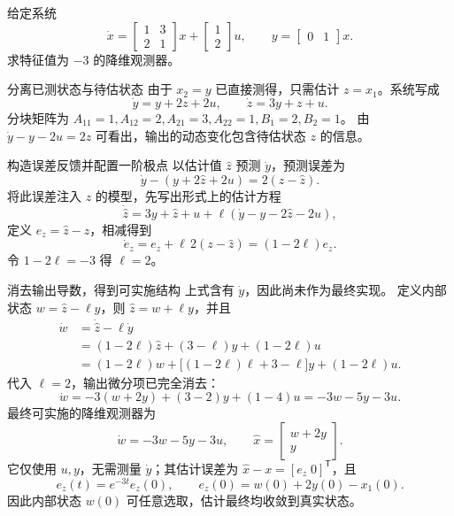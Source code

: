 \documentclass[11pt]{article}
\begin{document}
\begin{problem}[原题 2]
给定系统
\[
 \dot x=\begin{bmatrix}1&3\\2&1\end{bmatrix}x+
 \begin{bmatrix}1\\2\end{bmatrix}u,
 \qquad y=\begin{bmatrix}0&1\end{bmatrix}x.
\]
求特征值为 $-3$ 的降维观测器。
\end{problem}
\begin{solution}
\begin{proofstep}{分离已测状态与待估状态}
由于 $x_2=y$ 已直接测得，只需估计 $z=x_1$。系统写成
\[
 \dot y=y+2z+2u,\qquad \dot z=3y+z+u.
\]
分块矩阵为 $A_{11}=1,A_{12}=2,A_{21}=3,A_{22}=1,B_1=2,B_2=1$。
由 $\dot y-y-2u=2z$ 可看出，输出的动态变化包含待估状态 $z$ 的信息。
\end{proofstep}
\begin{proofstep}{构造误差反馈并配置一阶极点}
以估计值 $\hat z$ 预测 $\dot y$，预测误差为
\[
 \dot y-(y+2\hat z+2u)=2(z-\hat z).
\]
将此误差注入 $z$ 的模型，先写出形式上的估计方程
\[
 \dot{\hat z}=3y+\hat z+u+\ell(\dot y-y-2\hat z-2u),
\]
定义 $e_z=\hat z-z$，相减得到
\[
 \dot e_z=e_z+\ell\,2(z-\hat z)=(1-2\ell)e_z.
\]
令 $1-2\ell=-3$ 得 $\ell=2$。
\end{proofstep}
\tcbbreak
\begin{proofstep}{消去输出导数，得到可实施结构}
上式含有 $\dot y$，因此尚未作为最终实现。
定义内部状态 $w=\hat z-\ell y$，则 $\hat z=w+\ell y$，并且
\[
 \begin{aligned}
 \dot w
 &=\dot{\hat z}-\ell\dot y\\
 &=(1-2\ell)\hat z+(3-\ell)y+(1-2\ell)u\\
 &=(1-2\ell)w+\bigl[(1-2\ell)\ell+3-\ell\bigr]y
   +(1-2\ell)u.
 \end{aligned}
\]
代入 $\ell=2$，输出微分项已完全消去：
\[
 \dot w=-3(w+2y)+(3-2)y+(1-4)u
 =-3w-5y-3u.
\]
最终可实施的降维观测器为
\[
 \boxed{\dot w=-3w-5y-3u,\qquad
 \hat x=\begin{bmatrix}w+2y\\y\end{bmatrix}.}
\]
它仅使用 $u,y$，无需测量 $\dot y$；其估计误差为
$\hat x-x=[e_z\;0]^{\mathsf T}$，且
\[
 e_z(t)=e^{-3t}e_z(0),\qquad e_z(0)=w(0)+2y(0)-x_1(0).
\]
因此内部状态 $w(0)$ 可任意选取，估计最终均收敛到真实状态。
\end{proofstep}
\end{solution}
\end{document}
